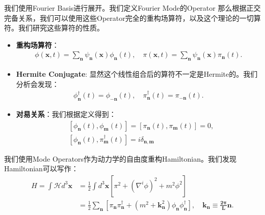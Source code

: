 我们使用Fourier Basis进行展开。我们定义Fourier Mode的Operator
那么根据正交完备关系，我们可以使用这些Operator完全的重构场算符，以及这个理论的一切算符。我们研究这些算符的性质。

\bigskip
{}

\begin{itemize}
  \item \textbf{重构场算符}：
    \begin{align}
      \phi(\mathbf{x},t)=\sum_\mathbf{n}\psi_\mathbf{n}(\mathbf{x})\phi_\mathbf{n}(t),\quad\pi(\mathbf{x},t)=\sum_\mathbf{n}\psi_\mathbf{n}(\mathbf{x})\pi_\mathbf{n}(t).
    \end{align}
  \item \textbf{Hermite Conjugate}: 显然这个线性组合后的算符不一定是Hermite的。我们分析会发现：
    \begin{align}
      \phi_\mathbf{n}^\dagger(t)=\phi_{-\mathbf{n}}(t),\quad\pi_\mathbf{n}^\dagger(t)=\pi_{-\mathbf{n}}(t).
    \end{align}
  \item \textbf{对易关系}：我们根据定义得到：
    \begin{align}
      &
      [\phi_{\mathbf{n}}(t),\phi_{\mathbf{m}}(t)]=[\pi_{\mathbf{n}}(t),\pi_{\mathbf{m}}(t)]=0,\\
      &
      [\phi_{\mathbf{n}}(t),\pi_{\mathbf{m}}^{\dagger}(t)]=i\delta_{\mathbf{n},\mathbf{m}}
    \end{align}
\end{itemize}

\bigskip
{}

我们使用Mode Operators作为动力学的自由度重构Hamiltonian。我们发现Hamiltonian可以写作：
\begin{align}
  H=\int\mathcal{H}d^3\mathbf{x}&=\frac{1}{2}\int
  d^3\mathbf{x}\left[\pi^2+(\nabla^i\phi)^2+m^2\phi^2\right]\\
  &=\frac{1}{2}\sum_{\mathbf{n}}\left[\pi_{\mathbf{n}}\pi_{\mathbf{n}}^{\dagger}+\left(m^2+\mathbf{k}_{\mathbf{n}}^2\right)\phi_{\mathbf{n}}\phi_{\mathbf{n}}^{\dagger}\right],\quad\mathbf{k_n\equiv\frac{2\pi}{L}n}.
\end{align}

